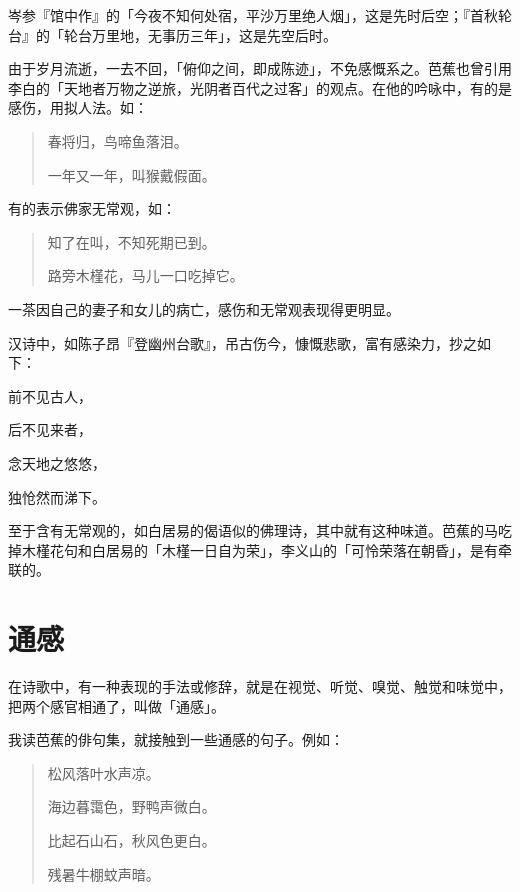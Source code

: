{    岑参『馆中作』的「今夜不知何处宿，平沙万里绝人烟」，这是先时后空；『首秋轮台』的「轮台万里地，无事历三年」，这是先空后时。

    由于岁月流逝，一去不回，「俯仰之间，即成陈迹」，不免感慨系之。芭蕉也曾引用李白的「天地者万物之逆旅，光阴者百代之过客」的观点。在他的吟咏中，有的是感伤，用拟人法。如：

    \begin{quote}
        春将归，鸟啼鱼落泪。

        一年又一年，叫猴戴假面。
    \end{quote}

    有的表示佛家无常观，如：

    \begin{quote}
        知了在叫，不知死期已到。

        路旁木槿花，马儿一口吃掉它。
    \end{quote}

    一茶因自己的妻子和女儿的病亡，感伤和无常观表现得更明显。

    汉诗中，如陈子昂『登幽州台歌』，吊古伤今，慷慨悲歌，富有感染力，抄之如下：

    \begin{center}
        前不见古人，

        后不见来者，

        念天地之悠悠，

        独怆然而涕下。
    \end{center}

    至于含有无常观的，如白居易的偈语似的佛理诗，其中就有这种味道。芭蕉的马吃掉木槿花句和白居易的「木槿一日自为荣」，李义山的「可怜荣落在朝昏」，是有牵联的。

    \section*{\FS 通感}

    在诗歌中，有一种表现的手法或修辞，就是在视觉、听觉、嗅觉、触觉和味觉中，把两个感官相通了，叫做「通感」。

    我读芭蕉的俳句集，就接触到一些通感的句子。例如：

    \begin{quote}
        松风落叶水声凉。

        海边暮霭色，野鸭声微白。

        比起石山石，秋风色更白。

        残暑牛棚蚊声暗。
    \end{quote}

}
